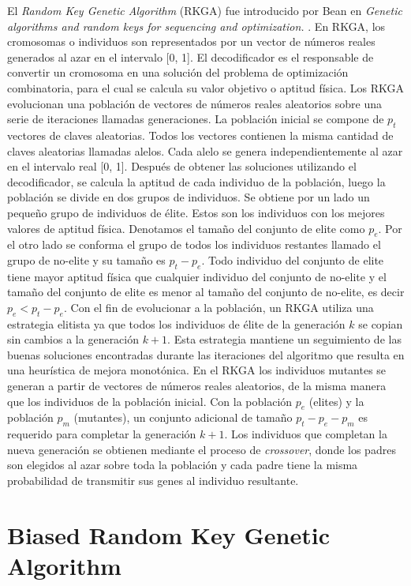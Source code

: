 El \textit{Random Key Genetic Algorithm} (RKGA) fue introducido por Bean en \textit{Genetic algorithms and random keys for sequencing and optimization.} \cite{Bean}. En RKGA, los cromosomas o individuos son representados por un vector de números reales generados al azar en el intervalo [0, 1]. El decodificador es el responsable de convertir un cromosoma en una solución del problema de optimización combinatoria, para el cual se calcula su valor objetivo o aptitud física. Los RKGA evolucionan una población de vectores de números reales aleatorios sobre una serie de iteraciones llamadas generaciones. La población inicial se compone de $p_t$ vectores de claves aleatorias. Todos los vectores contienen la misma cantidad de claves aleatorias llamadas alelos. Cada alelo se genera independientemente al azar en el intervalo real [0, 1]. Después de obtener las soluciones utilizando el decodificador, se calcula la aptitud de cada individuo de la población, luego la población se divide en dos grupos de individuos. Se obtiene por un lado un pequeño grupo de individuos de élite. Estos son los individuos con los mejores valores de aptitud física. Denotamos el tamaño del conjunto de elite como $p_e$. Por el otro lado se conforma el grupo de todos los individuos restantes llamado el grupo de no-elite y su tamaño es $p_t-p_e$. Todo individuo del conjunto de elite tiene mayor aptitud física que cualquier individuo del conjunto de no-elite y el tamaño del conjunto de elite es menor al tamaño del conjunto de no-elite, es decir $p_e<p_t-p_e$. Con el fin de evolucionar a la población, un RKGA utiliza una estrategia elitista ya que todos los individuos de élite de la generación $k$ se copian sin cambios a la generación $k+1$. Esta estrategia mantiene un seguimiento de las buenas soluciones encontradas durante las iteraciones del algoritmo que resulta en una heurística de mejora monotónica. En el RKGA los individuos mutantes se generan a partir de vectores de números reales aleatorios, de la misma manera que los individuos de la población inicial. Con la población $p_e$ (elites) y la población $p_m$ (mutantes), un conjunto adicional de tamaño $p_t - p_e - p_m$ es requerido para completar la generación $k+1$. Los individuos que completan la nueva generación se obtienen mediante el proceso de \textit{crossover}, donde los padres son elegidos al azar sobre toda la población y cada padre tiene la misma probabilidad de transmitir sus genes al individuo resultante.

\section{Biased Random Key Genetic Algorithm}\label{sec:brkga}

